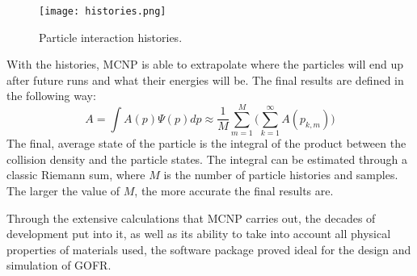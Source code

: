 \begin{figure}[!htbp]
\caption{Particle interaction histories.}
\label{fig:histories}
\centering
\texttt{[image: histories.png]}
\end{figure}
With the histories, MCNP is able to extrapolate where the particles will end up after future runs and what their energies will be. The final results are defined in the following way:
\begin{equation*}
A = \int A(p)\Psi(p)dp \approx \frac{1}{M}\sum_{m=1}^M\Big(\sum_{k=1}^\infty A(p_{k,m})\Big)
\end{equation*}
The final, average state of the particle is the integral of the product between the collision density and the particle states. The integral can be estimated through a classic Riemann sum, where $M$ is the number of particle histories and samples. The larger the value of $M$, the more accurate the final results are. 

Through the extensive calculations that MCNP carries out, the decades of development put into it, as well as its ability to take into account all physical properties of materials used, the software package proved ideal for the design and simulation of GOFR.
